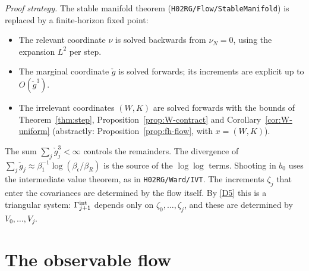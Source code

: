 \documentclass[11pt]{amsart}
\theoremstyle{definition}
\theoremstyle{remark}
\numberwithin{equation}{section}
\begin{document}
\emph{Proof strategy.} The stable manifold theorem (\texttt{H02RG/Flow/StableManifold}) is replaced
by a finite-horizon fixed point:
\begin{itemize}
\item The relevant coordinate $\nu$ is solved backwards from $\nu_N=0$, using the expansion
  $L^2$ per step.
\item The marginal coordinate $\check g$ is solved forwards; its increments are explicit up to
  $O(\check g^3)$.
\item The irrelevant coordinates $(W,K)$ are solved forwards with the bounds of
  Theorem~\ref{thm:step}, Proposition~\ref{prop:W-contract} and Corollary~\ref{cor:W-uniform}
  (abstractly: Proposition~\ref{prop:fh-flow}, with $x=(W,K)$).
\end{itemize}
The sum $\sum_j\check g_j^3<\infty$ controls the remainders. The divergence of
$\sum_j\check g_j\approx\beta_1^{-1}\log(\beta_\epsilon/\beta_R)$ is the source of the $\log\log$
terms. Shooting in $b_0$ uses the intermediate value theorem, as in \texttt{H02RG/Ward/IVT}. The
increments $\zeta_j$ that enter the covariances are determined by the flow itself. By
\ref{D5} this is a triangular system: $\Gamma^{\rm int}_{j+1}$ depends only on
$\zeta_0,\dots,\zeta_j$, and these are determined by $V_0,\dots,V_j$.

\section{The observable flow}
\label{sec:obs-flow}
\end{document}
